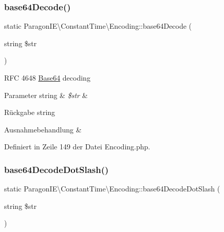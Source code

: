\subsubsection{\texorpdfstring{base64\+Decode()}{base64Decode()}}
{\footnotesize\ttfamily static Paragon\+I\+E\textbackslash{}\+Constant\+Time\textbackslash{}\+Encoding\+::base64\+Decode (\begin{DoxyParamCaption}\item[{string}]{\$str }\end{DoxyParamCaption})\hspace{0.3cm}{\ttfamily [static]}}

R\+FC 4648 \mbox{\hyperlink{class_paragon_i_e_1_1_constant_time_1_1_base64}{Base64}} decoding


\begin{DoxyParams}[1]{Parameter}
string & {\em \$str} & \\
\hline
\end{DoxyParams}
\begin{DoxyReturn}{Rückgabe}
string 
\end{DoxyReturn}

\begin{DoxyExceptions}{Ausnahmebehandlung}
{\em } & \\
\hline
\end{DoxyExceptions}


Definiert in Zeile 149 der Datei Encoding.\+php.

\mbox{\label{class_paragon_i_e_1_1_constant_time_1_1_encoding_a83ca331a2527e9e4b62688e7c014f672}} 
\subsubsection{\texorpdfstring{base64\+Decode\+Dot\+Slash()}{base64DecodeDotSlash()}}
{\footnotesize\ttfamily static Paragon\+I\+E\textbackslash{}\+Constant\+Time\textbackslash{}\+Encoding\+::base64\+Decode\+Dot\+Slash (\begin{DoxyParamCaption}\item[{string}]{\$str }\end{DoxyParamCaption})\hspace{0.3cm}{\ttfamily [static]}}

